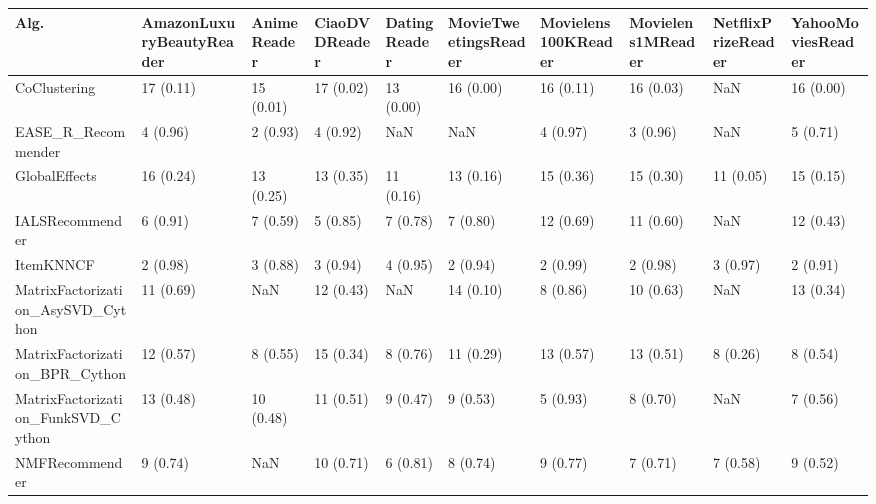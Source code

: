 \begin{tabular}{llllllllll}
\toprule
                               Alg. & AmazonLuxuryBeautyReader & AnimeReader & CiaoDVDReader & DatingReader & MovieTweetingsReader & Movielens100KReader & Movielens1MReader & NetflixPrizeReader & YahooMoviesReader \\
\midrule
                       CoClustering &                17 (0.11) &   15 (0.01) &     17 (0.02) &    13 (0.00) &            16 (0.00) &           16 (0.11) &         16 (0.03) &                NaN &         16 (0.00) \\
                 EASE\_R\_Recommender &                 4 (0.96) &    2 (0.93) &      4 (0.92) &          NaN &                  NaN &            4 (0.97) &          3 (0.96) &                NaN &          5 (0.71) \\
                      GlobalEffects &                16 (0.24) &   13 (0.25) &     13 (0.35) &    11 (0.16) &            13 (0.16) &           15 (0.36) &         15 (0.30) &          11 (0.05) &         15 (0.15) \\
                    IALSRecommender &                 6 (0.91) &    7 (0.59) &      5 (0.85) &     7 (0.78) &             7 (0.80) &           12 (0.69) &         11 (0.60) &                NaN &         12 (0.43) \\
                          ItemKNNCF &                 2 (0.98) &    3 (0.88) &      3 (0.94) &     4 (0.95) &             2 (0.94) &            2 (0.99) &          2 (0.98) &           3 (0.97) &          2 (0.91) \\
  MatrixFactorization\_AsySVD\_Cython &                11 (0.69) &         NaN &     12 (0.43) &          NaN &            14 (0.10) &            8 (0.86) &         10 (0.63) &                NaN &         13 (0.34) \\
     MatrixFactorization\_BPR\_Cython &                12 (0.57) &    8 (0.55) &     15 (0.34) &     8 (0.76) &            11 (0.29) &           13 (0.57) &         13 (0.51) &           8 (0.26) &          8 (0.54) \\
 MatrixFactorization\_FunkSVD\_Cython &                13 (0.48) &   10 (0.48) &     11 (0.51) &     9 (0.47) &             9 (0.53) &            5 (0.93) &          8 (0.70) &                NaN &          7 (0.56) \\
                     NMFRecommender &                 9 (0.74) &         NaN &     10 (0.71) &     6 (0.81) &             8 (0.74) &            9 (0.77) &          7 (0.71) &           7 (0.58) &          9 (0.52) \\

\end{tabular}
